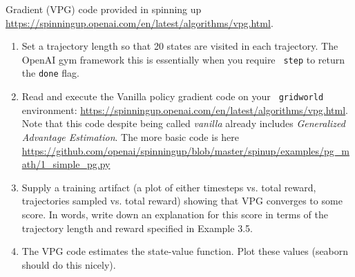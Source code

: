 \documentclass{article}
\begin{document}
\begin{enumerate}
  Gradient (VPG) code provided in spinning up
  \url{https://spinningup.openai.com/en/latest/algorithms/vpg.html}.
  \begin{enumerate}
  \item Set a trajectory length so that 20 states are visited in each
    trajectory. The OpenAI gym framework this is essentially when you require {\tt
      step} to return the {\tt done} flag.
  \item Read and execute the Vanilla policy gradient code on your {\tt
      gridworld} environment:
    \url{https://spinningup.openai.com/en/latest/algorithms/vpg.html}. Note that
    this code despite being called {\em vanilla} already includes {\em Generalized
      Advantage Estimation}. The more basic code is here
    \url{https://github.com/openai/spinningup/blob/master/spinup/examples/pg_math/1_simple_pg.py}
  \item Supply a training artifact (a plot of either timesteps vs. total reward,
    trajectories sampled vs. total reward) showing that VPG converges to some score.
    In words, write down an explanation for this score in terms of the trajectory
    length and reward specified in Example 3.5.
  \item The VPG code estimates the state-value function. Plot these values
    (seaborn should do this nicely).
  \end{enumerate}
\end{enumerate}
\end{document}
